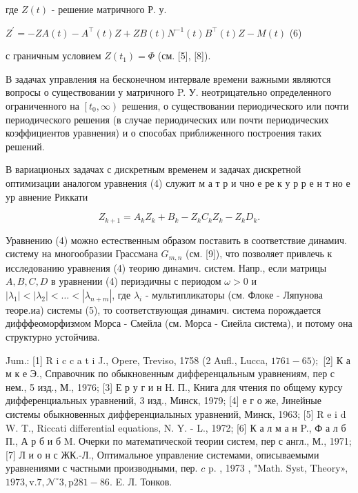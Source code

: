\documentclass[10pt]{article}
\begin{document}
где $Z(t)$ - решение матричного Р. у.



$Z^{\prime}=-Z A(t)-A^{\top}(t) Z+Z B(t) N^{-1}(t) B^{\top}(t) Z-M(t)$ (6)



с граничным условием $Z\left(t_{1}\right)=\Phi$ (см. [5], [8]).



В задачах управления на бесконечном интервале времени важными являются вопросы о существовании у матричного P. У. неотрицательно определенного ограниченного на $\left[t_{0}, \infty\right)$ решения, о существовании периодического или почти периодического решения (в случае периодических или почти периодических коэффициентов уравнения) и о способах приближенного построения таких решений.



В вариационых задачах с дискретным временем и задачах дискретной оптимизации аналогом уравнения (4) служит м а т р и чно е ре к у р р е н т но е ур авнение Риккати



\[

Z_{k+1}=A_{k} Z_{k}+B_{k}-Z_{k} C_{k} Z_{k}-Z_{k} D_{k} .

\]



Уравнению (4) можно естественным образом поставить в соответствие динамич. систему на многообразии Грассмана $G_{m, n}$ (см. [9]), что позволяет привлечь к исследованию уравнения (4) теорию динамич. систем. Напр., если матрицы $A, B, C, D$ в уравнении (4) периэдичны с периодом $\omega>0$ и $\left|\lambda_{1}\right|<\left|\lambda_{2}\right|<\ldots<\left|\lambda_{n+m}\right|$, где $\lambda_{i}$ - мультипликаторы (см. Флоке - Ляпунова теоре.иа) системы (5), то соответствующая динамич. система порождается дифффеоморфизмом Морса - Смейла (см. Морса - Сиейла система), и потому она структурно устойчива.



Jum.: [1] R i c c a t i J., Opere, Treviso, 1758 (2 Aufl., Lucca, $1761-65) ;$ [2] К а м к е Э., Справочник по обыкновенным дифференцальным уравнениям, пер с нем., 5 изд., М., 1976; [3] Е р у г и н Н. П., Книга для чтения по общему курсу дифференциальных уравнений, 3 изд., Минск, 1979; [4] е г о же, Јинейные системы обыкновенных дифференциалыных уравнений, Минск, 1963; [5] R e i d W. T., Riccati differential equations, N. Y. - L., 1972; [6] К а л м а н P., Ф а л б П., А р б и б M. Очерки по математической теории систем, пер с англ., М., 1971; [7] Л и о н с ЖК.-Л., Оптимальное управление системами, описываемыми уравнениями с частными производными, пер. $c$ p. , 1973 , "Math. Syst, Theory», $1973, \mathrm{v} .7, \mathcal{N}^{\circ} 3, \mathrm{p} 281-86$. E. Л. Тонков.
\end{document}
